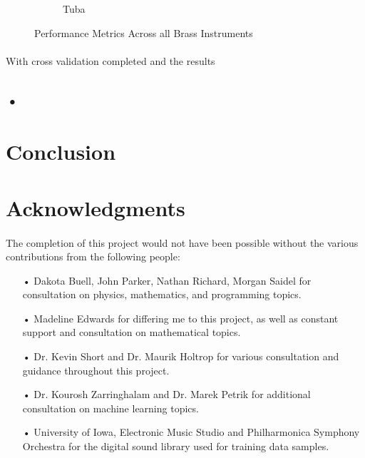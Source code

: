 \documentclass[12pt,letterpaper]{article}
\begin{document}
\begin{figure}[H]
\begin{subfigure}[b]{0.45\textwidth}
	\caption{Tuba}
	\end{subfigure}
\caption{Performance Metrics Across all Brass Instruments}
\label{fig-BrassScores}
\end{figure}

\paragraph*{}With cross validation completed and the results 


\subsection{•}




\newpage
\section{Conclusion}
\label{sec-Conclusion}



\newpage
\section{Acknowledgments}
\label{sec-Acknowledge}

\paragraph*{}The completion of this project would not have been possible without the various contributions from the following people:

\begin{itemize}

\item[•]Dakota Buell, John Parker, Nathan Richard, Morgan Saidel for consultation on physics, mathematics, and programming topics.

\item[•]Madeline Edwards for differing me to this project, as well as constant support and consultation on mathematical topics.

\item[•]Dr. Kevin Short and Dr. Maurik Holtrop for various consultation and guidance throughout this project.

\item[•]Dr. Kourosh Zarringhalam and Dr. Marek Petrik for additional consultation on machine learning topics.

\item[•]University of Iowa, Electronic Music Studio and Philharmonica Symphony Orchestra for the digital sound library used for training data samples.

\end{itemize}
\end{document}
